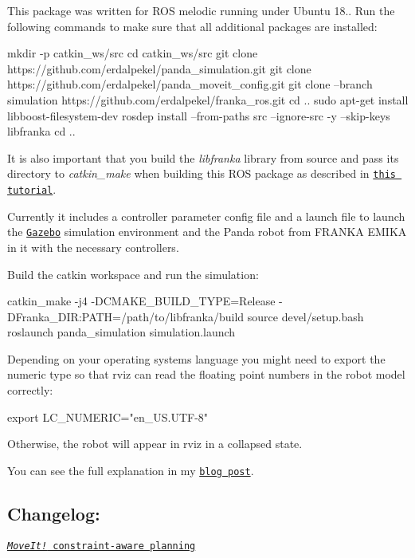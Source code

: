 

This package was written for R\+OS melodic running under Ubuntu 18.. Run the following commands to make sure that all additional packages are installed\+:


\begin{DoxyCode}
mkdir -p catkin\_ws/src
cd catkin\_ws/src
git clone https://github.com/erdalpekel/panda\_simulation.git
git clone https://github.com/erdalpekel/panda\_moveit\_config.git
git clone --branch simulation https://github.com/erdalpekel/franka\_ros.git
cd ..
sudo apt-get install libboost-filesystem-dev
rosdep install --from-paths src --ignore-src -y --skip-keys libfranka
cd ..
\end{DoxyCode}
 It is also important that you build the {\itshape libfranka} library from source and pass its directory to {\itshape catkin\+\_\+make} when building this R\+OS package as described in \href{https://frankaemika.github.io/docs/installation.html#building-from-source}{\tt this tutorial}.

Currently it includes a controller parameter config file and a launch file to launch the \href{http://gazebosim.org}{\tt Gazebo} simulation environment and the Panda robot from F\+R\+A\+N\+KA E\+M\+I\+KA in it with the necessary controllers.

Build the catkin workspace and run the simulation\+: 
\begin{DoxyCode}
catkin\_make -j4 -DCMAKE\_BUILD\_TYPE=Release -DFranka\_DIR:PATH=/path/to/libfranka/build
source devel/setup.bash
roslaunch panda\_simulation simulation.launch
\end{DoxyCode}


Depending on your operating systems language you might need to export the numeric type so that rviz can read the floating point numbers in the robot model correctly\+:


\begin{DoxyCode}
export LC\_NUMERIC="en\_US.UTF-8"
\end{DoxyCode}
 Otherwise, the robot will appear in rviz in a collapsed state.

You can see the full explanation in my \href{https://erdalpekel.de/?p=55}{\tt blog post}.

\subsection*{Changelog\+:}

\href{https://erdalpekel.de/?p=123}{\tt {\itshape Move\+It!} constraint-\/aware planning}

